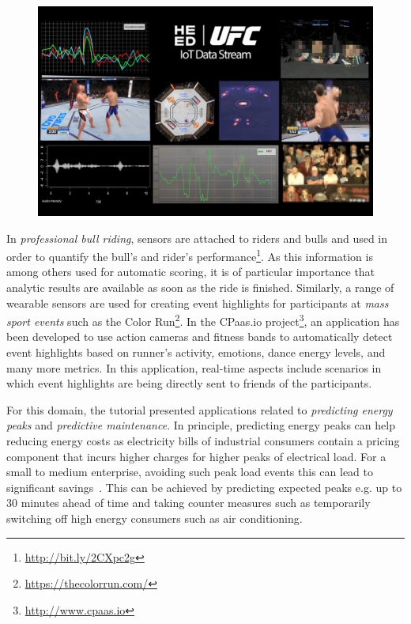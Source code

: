 \begin{figure}[t]
\includegraphics[scale=0.15]{pictures/DP6L8S9XkAYFMCw.jpg}
\label{FIG:FightStreams}
\end{figure}

In \emph{professional bull riding}, sensors are attached to riders and bulls and used in order to quantify the bull's and rider's performance\footnote{\url{http://bit.ly/2CXpc2g}}. As this information is among others used for automatic scoring, it is of particular importance that analytic results are available as soon as the ride is finished. Similarly, a range of wearable sensors are used for creating event highlights for participants at \emph{mass sport events} such as the Color Run\footnote{\url{https://thecolorrun.com/}}. In the \textsf{CPaas.io} project\footnote{\url{http://www.cpaas.io}}, an application has been developed to use action cameras and fitness bands to automatically detect event highlights based on runner's activity, emotions, dance energy levels, and many more metrics. In this application, real-time aspects include scenarios in which event highlights are being directly sent to friends of the participants.

For this domain, the tutorial presented applications related to \emph{predicting energy peaks} and \emph{predictive maintenance}. In principle, predicting energy peaks can help reducing energy costs as electricity bills of industrial consumers contain a pricing component that incurs higher charges for higher peaks of electrical load. For a small to medium enterprise, avoiding such peak load events this can lead to significant savings~\cite{strohbach_and_toll_2016}. This can be achieved by predicting expected peaks e.g. up to 30 minutes ahead of time and taking counter measures such as temporarily switching off high energy consumers such as air conditioning.

